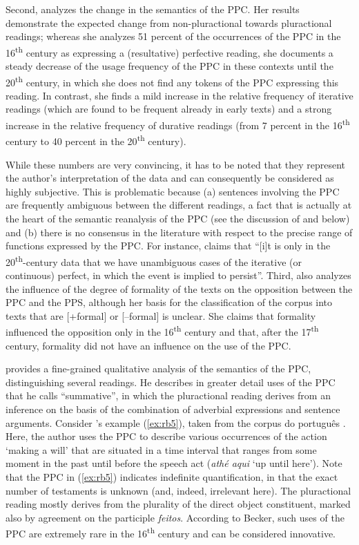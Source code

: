 \documentclass[output=paper,colorlinks,citecolor=brown]{langscibook}
\begin{document}
Second, \citet[93]{Barbosa2014} analyzes the change in the semantics of the PPC. Her results demonstrate the expected change from non-pluractional towards pluractional readings; whereas she analyzes 51 percent of the occurrences of the PPC in the 16\textsuperscript{th} century as expressing a (resultative) perfective reading, she documents a steady decrease of the usage frequency of the PPC in these contexts until the 20\textsuperscript{th} century, in which she does not find any tokens of the PPC expressing this reading. In contrast, she finds a mild increase in the relative frequency of iterative readings (which are found to be frequent already in early texts) and a strong increase in the relative frequency of durative readings (from 7 percent in the 16\textsuperscript{th} century to 40 percent in the 20\textsuperscript{th} century). 

While these numbers are very convincing, it has to be noted that they represent the author’s interpretation of the data and can consequently be considered as highly subjective. This is problematic because (a) sentences involving the PPC are frequently ambiguous between the different readings, a fact that is actually at the heart of the semantic reanalysis of the PPC (see the discussion of \cite{Becker2017} and \cite{AmaralHowe2012} below) and (b) there is no consensus in the literature with respect to the precise range of functions expressed by the PPC. For instance, \citet[487]{Olbertz2018} claims that “[i]t is only in the 20\textsuperscript{th}-century data that we have unambiguous cases of the iterative (or continuous) perfect, in which the event is implied to persist”. Third, \citet{Barbosa2014} also analyzes the influence of the degree of formality of the texts on the opposition between the PPC and the PPS, although her basis for the classification of the corpus into texts that are [+formal] or [$–$formal] is unclear. She claims that formality influenced the opposition only in the 16\textsuperscript{th} century and that, after the 17\textsuperscript{th} century, formality did not have an influence on the use of the PPC.

\citet{Becker2017} provides a fine-grained qualitative analysis of the semantics of the PPC, distinguishing several readings. He describes in greater detail uses of the PPC that he calls “summative”, in which the pluractional reading derives from an inference on the basis of the combination of adverbial expressions and sentence arguments. Consider \citeauthor{Becker2017}’s example (\ref{ex:rb5}), taken from the corpus do português \citep{Davies2016P}. Here, the author uses the PPC to describe various occurrences of the action ‘making a will’ that are situated in a time interval that ranges from some moment in the past until before the speech act (\textit{athé aqui} ‘up until here’). Note that the PPC in (\ref{ex:rb5}) indicates indefinite quantification, in that the exact number of testaments is unknown (and, indeed, irrelevant here). The pluractional reading mostly derives from the plurality of the direct object constituent, marked also by agreement on the participle \textit{feitos}. According to Becker, such uses of the PPC are extremely rare in the 16\textsuperscript{th} century and can be considered innovative.
\end{document}
